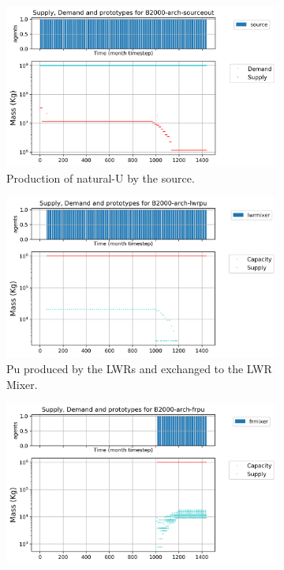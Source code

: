 \documentclass[11pt,letterpaper]{article}
\begin{document}
\begin{figure}[!htbp]
	\centering
	\begin{subfigure}[t]{.8\textwidth}
		\centering
		\includegraphics[width=\linewidth]{B2000-arch-sourceout.png} 
		\caption{Production of natural-U by the source.}
		\label{fig:23-arch-sourceout}
	\end{subfigure}
	\vspace{.9cm}
	\begin{subfigure}[t]{.45\textwidth}
		\centering
		\includegraphics[width=\linewidth]{B2000-arch-lwrpu.png} 
		\caption{Pu produced by the LWRs and exchanged to the LWR Mixer.}
		\label{fig:23-arch-lwrpu}
	\end{subfigure}
	\begin{subfigure}[t]{.45\textwidth}
	\centering
	\includegraphics[width=\linewidth]{B2000-arch-frpu.png} 

\end{subfigure}
\end{figure}
\end{document}
